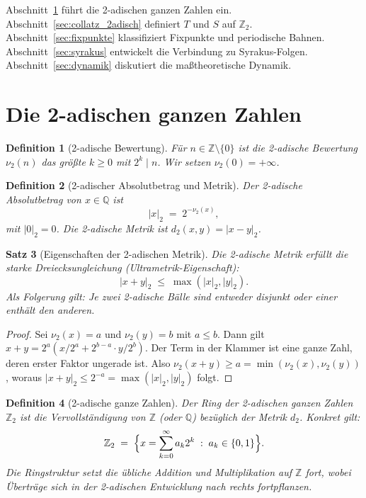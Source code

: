 \documentclass[12pt,a4paper]{article}
\newtheorem{theorem}{Satz}[section]
\newtheorem{definition}[theorem]{Definition}
\begin{document}
Abschnitt~\ref{sec:2adisch} führt die 2-adischen ganzen Zahlen ein. Abschnitt~\ref{sec:collatz_2adisch}
definiert $T$ und $S$ auf $\mathbb{Z}_2$. Abschnitt~\ref{sec:fixpunkte} klassifiziert
Fixpunkte und periodische Bahnen. Abschnitt~\ref{sec:syrakus} entwickelt die Verbindung
zu Syrakus-Folgen. Abschnitt~\ref{sec:dynamik} diskutiert die maßtheoretische Dynamik.

\section{Die 2-adischen ganzen Zahlen}\label{sec:2adisch}

\begin{definition}[2-adische Bewertung]\label{def:bewertung}
Für $n \in \mathbb{Z} \setminus \{0\}$ ist die \emph{2-adische Bewertung} $\nu_2(n)$ das
größte $k \geq 0$ mit $2^k \mid n$. Wir setzen $\nu_2(0) = +\infty$.
\end{definition}

\begin{definition}[2-adischer Absolutbetrag und Metrik]\label{def:metrik}
Der \emph{2-adische Absolutbetrag} von $x \in \mathbb{Q}$ ist
\[
  |x|_2 \;=\; 2^{-\nu_2(x)},
\]
mit $|0|_2 = 0$. Die \emph{2-adische Metrik} ist $d_2(x,y) = |x-y|_2$.
\end{definition}

\begin{theorem}[Eigenschaften der 2-adischen Metrik]\label{thm:ultrametrik}
Die 2-adische Metrik erfüllt die \emph{starke Dreiecksungleichung} (Ultrametrik-Eigenschaft):
\[
  |x + y|_2 \;\leq\; \max(|x|_2, |y|_2).
\]
Als Folgerung gilt: Je zwei 2-adische Bälle sind entweder disjunkt oder einer enthält
den anderen.
\end{theorem}

\begin{proof}
Sei $\nu_2(x) = a$ und $\nu_2(y) = b$ mit $a \leq b$. Dann gilt
$x + y = 2^a(x/2^a + 2^{b-a} \cdot y/2^b)$.
Der Term in der Klammer ist eine ganze Zahl, deren erster Faktor ungerade ist. Also
$\nu_2(x+y) \geq a = \min(\nu_2(x), \nu_2(y))$, woraus
$|x+y|_2 \leq 2^{-a} = \max(|x|_2, |y|_2)$ folgt.
\end{proof}

\begin{definition}[2-adische ganze Zahlen]\label{def:Z2}
Der \emph{Ring der 2-adischen ganzen Zahlen} $\mathbb{Z}_2$ ist die Vervollständigung von
$\mathbb{Z}$ (oder $\mathbb{Q}$) bezüglich der Metrik $d_2$. Konkret gilt:
\[
  \mathbb{Z}_2 \;=\; \Bigl\{ x = \sum_{k=0}^\infty a_k 2^k \;:\; a_k \in \{0,1\} \Bigr\}.
\]
Die Ringstruktur setzt die übliche Addition und Multiplikation auf $\mathbb{Z}$ fort,
wobei Überträge sich in der 2-adischen Entwicklung nach rechts fortpflanzen.
\end{definition}
\end{document}
